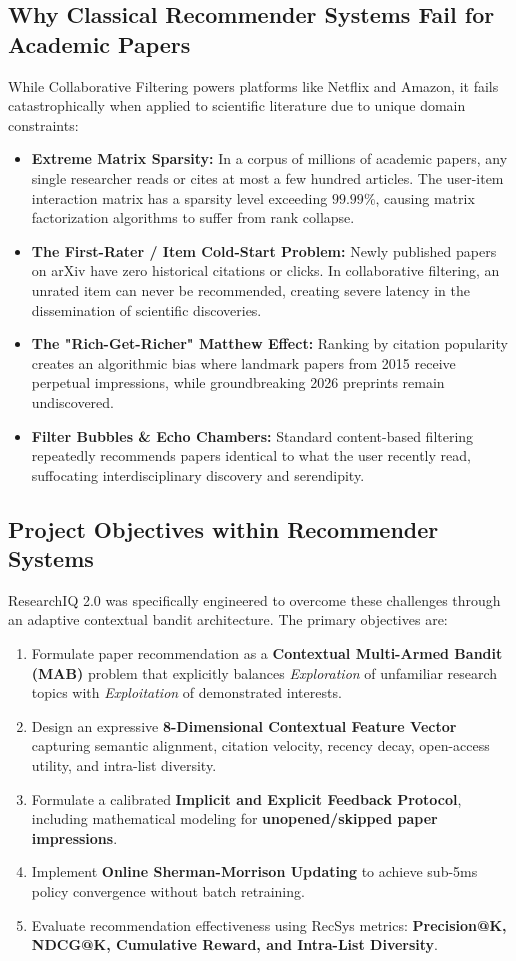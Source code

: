 \documentclass[11pt,a4paper]{article}
\begin{document}
\subsection{Why Classical Recommender Systems Fail for Academic Papers}
While Collaborative Filtering powers platforms like Netflix and Amazon, it fails catastrophically when applied to scientific literature due to unique domain constraints:
\begin{itemize}[leftmargin=1.5em]
    \item \textbf{Extreme Matrix Sparsity:} In a corpus of millions of academic papers, any single researcher reads or cites at most a few hundred articles. The user-item interaction matrix has a sparsity level exceeding $99.99\%$, causing matrix factorization algorithms to suffer from rank collapse.
    \item \textbf{The First-Rater / Item Cold-Start Problem:} Newly published papers on arXiv have zero historical citations or clicks. In collaborative filtering, an unrated item can never be recommended, creating severe latency in the dissemination of scientific discoveries.
    \item \textbf{The "Rich-Get-Richer" Matthew Effect:} Ranking by citation popularity creates an algorithmic bias where landmark papers from 2015 receive perpetual impressions, while groundbreaking 2026 preprints remain undiscovered.
    \item \textbf{Filter Bubbles \& Echo Chambers:} Standard content-based filtering repeatedly recommends papers identical to what the user recently read, suffocating interdisciplinary discovery and serendipity.
\end{itemize}

\subsection{Project Objectives within Recommender Systems}
ResearchIQ 2.0 was specifically engineered to overcome these challenges through an adaptive contextual bandit architecture. The primary objectives are:
\begin{enumerate}[leftmargin=1.5em]
    \item Formulate paper recommendation as a \textbf{Contextual Multi-Armed Bandit (MAB)} problem that explicitly balances \textit{Exploration} of unfamiliar research topics with \textit{Exploitation} of demonstrated interests.
    \item Design an expressive \textbf{8-Dimensional Contextual Feature Vector} capturing semantic alignment, citation velocity, recency decay, open-access utility, and intra-list diversity.
    \item Formulate a calibrated \textbf{Implicit and Explicit Feedback Protocol}, including mathematical modeling for \textbf{unopened/skipped paper impressions}.
    \item Implement \textbf{Online Sherman-Morrison Updating} to achieve sub-5ms policy convergence without batch retraining.
    \item Evaluate recommendation effectiveness using RecSys metrics: \textbf{Precision@K, NDCG@K, Cumulative Reward, and Intra-List Diversity}.
\end{enumerate}
\end{document}

